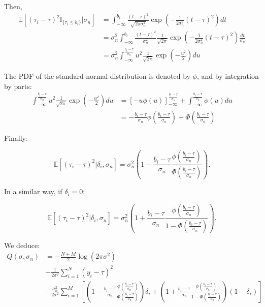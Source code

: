 \documentclass[11pt]{article}
\begin{document}
Then,
\begin{align*}
  \mathbb{E}\left[(\tau_i - \tau)^2 \mathbb{I}_{\{\tau_i \leq b_i\}}|\sigma_n\right] &= \int_{-\infty}^{b_i}\frac{(t-\tau)^2}{\sqrt{2\pi \sigma_n^2}}\exp\left(-\frac{1}{2\sigma_n^2}(t - \tau)^2\right)dt\\
  & = \sigma_n^2 \int_{-\infty}^{b_i}\frac{(t-\tau)^2}{\sigma_n^2}\frac{1}{\sqrt{2\pi}}\exp\left(-\frac{1}{2\sigma_n^2}(t - \tau)^2\right)\frac{dt}{\sigma_n}\\
  & = \sigma_n^2 \int_{-\infty}^{\frac{b_i - \tau}{\sigma_n}} u^2 \frac{1}{\sqrt{2\pi}}\exp\left(-\frac{u^2}{2}\right)du
\end{align*}

The PDF of the standard normal distribution is denoted by $\phi$, and by integration by parts:
\begin{align*}
\int_{-\infty}^{\frac{b_i - \tau}{\sigma_n}} u^2 \frac{1}{\sqrt{2\pi}}\exp\left(-\frac{u^2}{2}\right)du & = \left[- u \phi(u)\right]_{-\infty}^{\frac{b_i - \tau}{\sigma_n}} + \int_{-\infty}^{\frac{b_i - \tau}{\sigma_n}} \phi(u)du\\
& = -\frac{b_i - \tau}{\sigma_n} \phi\left(\frac{b_i - \tau}{\sigma_n}\right) + \Phi\left(\frac{b_i - \tau}{\sigma_n}\right)
\end{align*}

Finally:

\[
  \mathbb{E}\left[(\tau_i - \tau)^2| \delta_i, \sigma_n\right] = \sigma_n^2 \left(1 - \frac{b_i - \tau}{\sigma_n} \frac{\phi\left(\frac{b_i - \tau}{\sigma_n}\right)}{ \Phi\left(\frac{b_i - \tau}{\sigma_n}\right)}\right).
\]

In a similar way, if $\delta_i = 0$:

\[
  \mathbb{E}\left[(\tau_i - \tau)^2| \delta_i, \sigma_n\right] = \sigma_n^2 \left(1 + \frac{b_i - \tau}{\sigma_n} \frac{\phi\left(\frac{b_i - \tau}{\sigma_n}\right)}{ 1 - \Phi\left(\frac{b_i - \tau}{\sigma_n}\right)}\right).
\]

We deduce:
\begin{align*}
  Q(\sigma, \sigma_n) &= - \frac{N + M}{2} \log(2 \pi \sigma^2) \\
  &- \frac{1}{2\sigma^2} \sum_{i = 1}^N (y_i - \tau)^2 \\
  &- \frac{\sigma_n^2}{2\sigma^2} \sum_{i = 1}^M \left[ \left(1 - \frac{b_i - \tau}{\sigma_n} \frac{\phi\left(\frac{b_i - \tau}{\sigma_n}\right)}{ \Phi\left(\frac{b_i - \tau}{\sigma_n}\right)}\right)\delta_i +  \left(1 + \frac{b_i - \tau}{\sigma_n} \frac{\phi\left(\frac{b_i - \tau}{\sigma_n}\right)}{ 1 - \Phi\left(\frac{b_i - \tau}{\sigma_n}\right)}\right)(1-\delta_i)\right]
\end{align*}
\end{document}
